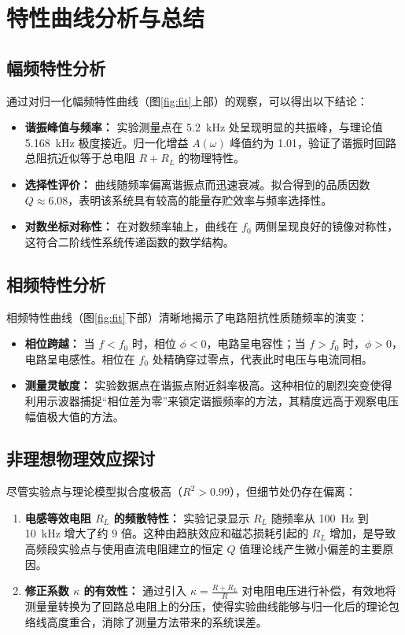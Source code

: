 \documentclass[11pt, a4paper]{article}
\begin{document}
	\section{特性曲线分析与总结}
	
	\subsection{幅频特性分析}
	通过对归一化幅频特性曲线（图\ref{fig:fit}上部）的观察，可以得出以下结论：
	\begin{itemize}
		\item \textbf{谐振峰值与频率：} 实验测量点在 \SI{5.2}{kHz} 处呈现明显的共振峰，与理论值 \SI{5.168}{kHz} 极度接近。归一化增益 $A(\omega)$ 峰值约为 \SI{1.01}{}，验证了谐振时回路总阻抗近似等于总电阻 $R + R_L$ 的物理特性。
		\item \textbf{选择性评价：} 曲线随频率偏离谐振点而迅速衰减。拟合得到的品质因数 $Q \approx 6.08$，表明该系统具有较高的能量存贮效率与频率选择性。
		\item \textbf{对数坐标对称性：} 在对数频率轴上，曲线在 $f_0$ 两侧呈现良好的镜像对称性，这符合二阶线性系统传递函数的数学结构。
	\end{itemize}
	
	\subsection{相频特性分析}
	相频特性曲线（图\ref{fig:fit}下部）清晰地揭示了电路阻抗性质随频率的演变：
	\begin{itemize}
		\item \textbf{相位跨越：} 当 $f < f_0$ 时，相位 $\phi < 0$，电路呈电容性；当 $f > f_0$ 时，$\phi > 0$，电路呈电感性。相位在 $f_0$ 处精确穿过零点，代表此时电压与电流同相。
		\item \textbf{测量灵敏度：} 实验数据点在谐振点附近斜率极高。这种相位的剧烈突变使得利用示波器捕捉“相位差为零”来锁定谐振频率的方法，其精度远高于观察电压幅值极大值的方法。
	\end{itemize}
	
	\subsection{非理想物理效应探讨}
	尽管实验点与理论模型拟合度极高（$R^2 > 0.99$），但细节处仍存在偏离：
	\begin{enumerate}
		\item \textbf{电感等效电阻 $R_L$ 的频散特性：} 实验记录显示 $R_L$ 随频率从 \SI{100}{Hz} 到 \SI{10}{kHz} 增大了约 $9$ 倍。这种由趋肤效应和磁芯损耗引起的 $R_L$ 增加，是导致高频段实验点与使用直流电阻建立的恒定 $Q$ 值理论线产生微小偏差的主要原因。
		\item \textbf{修正系数 $\kappa$ 的有效性：} 通过引入 $\kappa = \frac{R+R_L}{R}$ 对电阻电压进行补偿，有效地将测量量转换为了回路总电阻上的分压，使得实验曲线能够与归一化后的理论包络线高度重合，消除了测量方法带来的系统误差。
	\end{enumerate}
	
\end{document}
